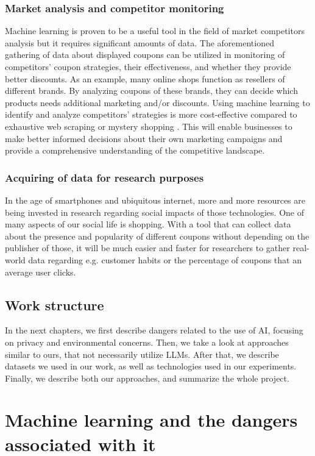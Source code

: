 \documentclass[licencjacka,en]{pracamgr}
\begin{document}
\subsection{Market analysis and competitor monitoring}
Machine learning is proven to be a useful tool in the field of market competitors analysis but it requires significant amounts of data\cite{competitor_tariffs}.
The aforementioned gathering of data about displayed coupons can be utilized in monitoring of competitors' coupon strategies, their effectiveness, and whether they provide better discounts. As an example, many online shops function as resellers of different brands. By analyzing coupons of these brands, they can decide which products needs additional marketing and/or discounts. Using machine learning to identify and analyze competitors' strategies is more cost-effective compared to exhaustive web scraping or mystery shopping \cite{competitor_tariffs}. This will enable businesses to make better informed decisions about their own marketing campaigns and provide a comprehensive understanding of the competitive landscape.

\subsection{Acquiring of data for research purposes}
In the age of smartphones and ubiquitous internet, more and more resources are being invested in research regarding social impacts of those technologies. One of many aspects of our social life is shopping. With a tool that can collect data about the presence and popularity of different coupons without depending on the publisher of those, it will be much easier and faster for researchers to gather real-world data regarding e.g. customer habits or the percentage of coupons that an average user clicks.

\section{Work structure}
In the next chapters, we first describe dangers related to the use of AI, focusing on privacy and environmental concerns. Then, we take a look at approaches similar to ours, that not necessarily utilize LLMs. After that, we describe datasets we used in our work, as well as technologies used in our experiments. Finally, we describe both our approaches, and summarize the whole project.


\chapter{Machine learning and the dangers associated with it}
\end{document}

